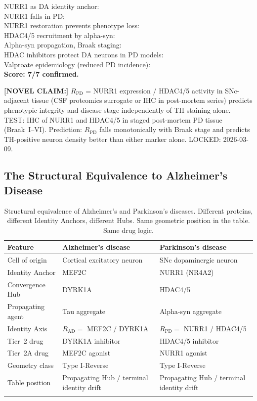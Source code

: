 \documentclass[12pt,a4paper]{article}
\newcommand{\rpd}{$R_{\mathrm{PD}}$}
\newcommand{\novel}[1]{\noindent\colorbox{yellow!18}{\parbox{\dimexpr\linewidth-2\fboxsep}{%
  \textbf{[NOVEL CLAIM:]} #1}}\vspace{0.4em}}
\begin{document}
\begin{description}[leftmargin=2em, itemsep=0.5em]
  \item[\textbf{Step~7 --- Literature confirmation:}]
    NURR1 as DA identity anchor: \checkmark\\
    NURR1 falls in PD: \checkmark\\
    NURR1 restoration prevents phenotype loss: \checkmark\\
    HDAC4/5 recruitment by alpha-syn: \checkmark\\
    Alpha-syn propagation, Braak staging: \checkmark\\
    HDAC inhibitors protect DA neurons in PD models: \checkmark\\
    Valproate epidemiology (reduced PD incidence): \checkmark\\
    \textbf{Score: 7/7 confirmed.}

  \item[\textbf{Step~8 --- Novel prediction locked:}]
    \novel{\rpd{} = NURR1 expression / HDAC4/5 activity in SNc-adjacent
    tissue (CSF proteomics surrogate or IHC in post-mortem series) predicts
    phenotypic integrity and disease stage independently of TH staining
    alone. TEST: IHC of NURR1 and HDAC4/5 in staged post-mortem PD tissue
    (Braak~I--VI). Prediction: \rpd{} falls monotonically with Braak stage
    and predicts TH-positive neuron density better than either marker alone.
    LOCKED: 2026-03-09.}
\end{description}

\subsection{The Structural Equivalence to Alzheimer's Disease}

\begin{longtable}{p{3.5cm} p{4cm} p{4cm}}
  \toprule
  \textbf{Feature} & \textbf{Alzheimer's disease} &
  \textbf{Parkinson's disease} \\
  \midrule
  Cell of origin & Cortical excitatory neuron & SNc dopaminergic neuron \\
  Identity Anchor & MEF2C & NURR1 (NR4A2) \\
  Convergence Hub & DYRK1A & HDAC4/5 \\
  Propagating agent & Tau aggregate & Alpha-syn aggregate \\
  Identity Axis & $R_{\mathrm{AD}} = $ MEF2C / DYRK1A &
    $R_{\mathrm{PD}} = $ NURR1 / HDAC4/5 \\
  Tier~2 drug & DYRK1A inhibitor & HDAC4/5 inhibitor \\
  Tier~2A drug & MEF2C agonist & NURR1 agonist \\
  Geometry class & Type I-Reverse & Type I-Reverse \\
  Table position & Propagating Hub / terminal identity drift &
    Propagating Hub / terminal identity drift \\
  \bottomrule
  \caption{Structural equivalence of Alzheimer's and Parkinson's diseases.
    Different proteins, different Identity Anchors, different Hubs.
    Same geometric position in the table. Same drug logic.}
\end{longtable}
\end{document}
